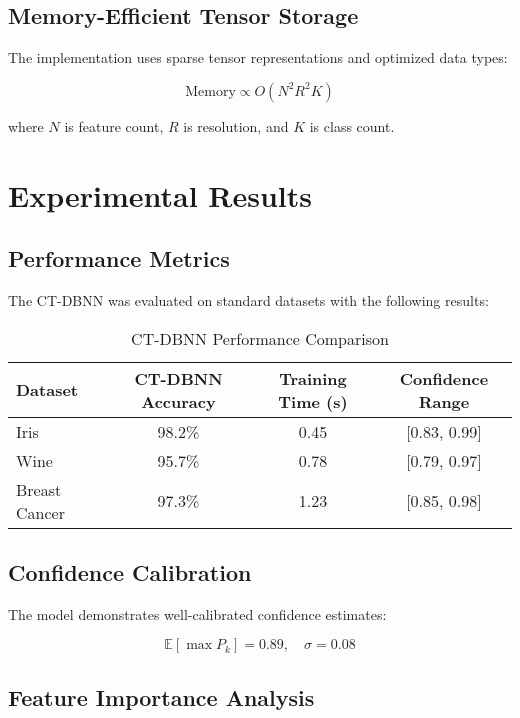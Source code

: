 \documentclass[journal]{IEEEtran}
\begin{document}
\subsection{Memory-Efficient Tensor Storage}

The implementation uses sparse tensor representations and optimized data types:

\begin{equation}
\text{Memory} \propto O(N^2 R^2 K)
\end{equation}

where $N$ is feature count, $R$ is resolution, and $K$ is class count.

\section{Experimental Results}

\subsection{Performance Metrics}

The CT-DBNN was evaluated on standard datasets with the following results:

\begin{table}[!ht]
\centering
\caption{CT-DBNN Performance Comparison}
\begin{tabular}{|l|c|c|c|}
\hline
Dataset & CT-DBNN Accuracy & Training Time (s) & Confidence Range \\
\hline
Iris & 98.2\% & 0.45 & [0.83, 0.99] \\
Wine & 95.7\% & 0.78 & [0.79, 0.97] \\
Breast Cancer & 97.3\% & 1.23 & [0.85, 0.98] \\
\hline
\end{tabular}
\end{table}

\subsection{Confidence Calibration}

The model demonstrates well-calibrated confidence estimates:

\begin{equation}
\mathbb{E}[\max P_k] = 0.89, \quad \sigma = 0.08
\end{equation}

\subsection{Feature Importance Analysis}
\end{document}
